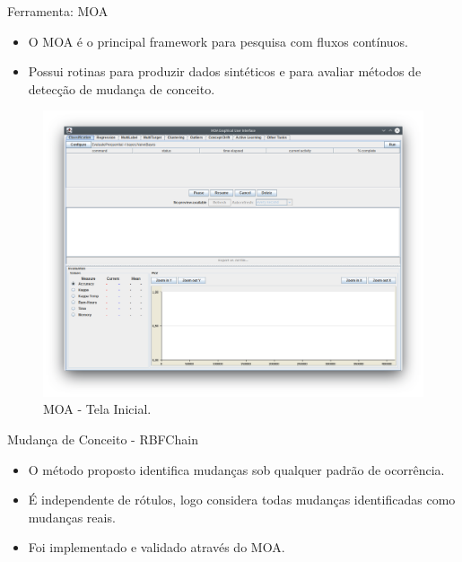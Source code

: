 \documentclass[10pt]{beamer}
\begin{document}
\begin{frame}{Ferramenta: MOA}
    \begin{itemize}
        \item<1 -> O MOA é o principal framework para pesquisa com fluxos contínuos.
        \item<1 -> Possui rotinas para produzir dados sintéticos e para avaliar métodos de detecção de mudança de conceito.
    \end{itemize}
    \begin{figure}[H]
        \begin{center}
            \includegraphics[scale=0.18]{imagens/moa.png}
            \caption{MOA - Tela Inicial.}
            \label{fig:moa}
        \end{center}
    \end{figure}
\end{frame}

\begin{frame}{Mudança de Conceito - RBFChain}
    \begin{itemize}
        \item<1 -> O método proposto identifica mudanças \alert{sob qualquer padrão de ocorrência}.
        \item<1 -> É independente de rótulos, logo considera todas mudanças identificadas como \alert{mudanças reais}.
        \item<1 -> Foi implementado e validado através do MOA.
    \end{itemize}
\end{frame}
\end{document}
